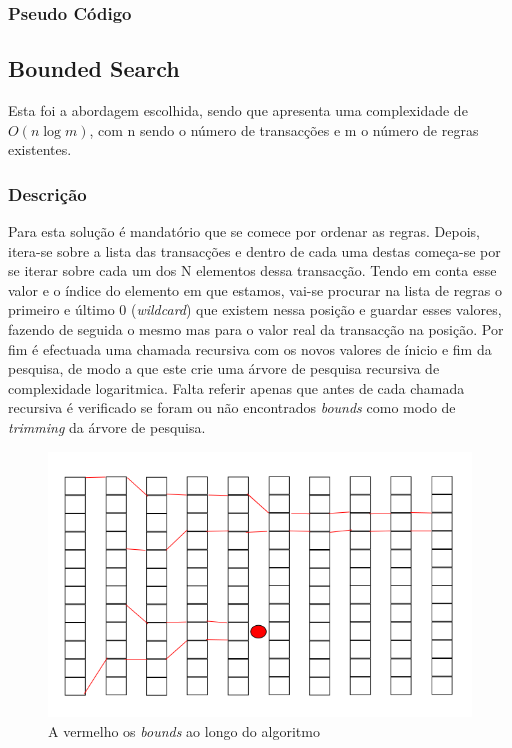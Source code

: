 \documentclass[a4paper]{article}
\begin{document}
\subsubsection{Pseudo Código}
\begin{algorithm}
	\begin{algorithmic}
					\ENDIF
				\ENDFOR	
				\ENDIF
			\ENDFOR
		\ENDFOR
	\end{algorithmic}
\end{algorithm}

\subsection{Bounded Search}
\indent \indent Esta foi a abordagem escolhida, sendo que apresenta uma complexidade de $O(n \log m)$, com n sendo o número de transacções e m o número de regras existentes.

\subsubsection{Descrição}
\indent \indent Para esta solução é mandatório que se comece por ordenar as regras. Depois, itera-se sobre a lista das transacções e dentro de cada uma destas começa-se por se iterar sobre cada um dos N elementos dessa transacção. Tendo em conta esse valor e o índice do elemento em que estamos, vai-se procurar na lista de regras o primeiro e último 0 (\textit{wildcard}) que existem nessa posição e guardar esses valores, fazendo de seguida o mesmo mas para o valor real da transacção na posição. Por fim é efectuada uma chamada recursiva com os novos valores de ínicio e fim da pesquisa, de modo a que este crie uma árvore de pesquisa recursiva de complexidade logaritmica. Falta referir apenas que antes de cada chamada recursiva é verificado se foram ou não encontrados \textit{bounds} como modo de \textit{trimming} da árvore de pesquisa.

\begin{figure}[h]
	\includegraphics[keepaspectratio=true, width=0.4\textheight]{algorithm.png}
	\caption{A vermelho os \textit{bounds} ao longo do algoritmo}
\end{figure}
\end{document}
